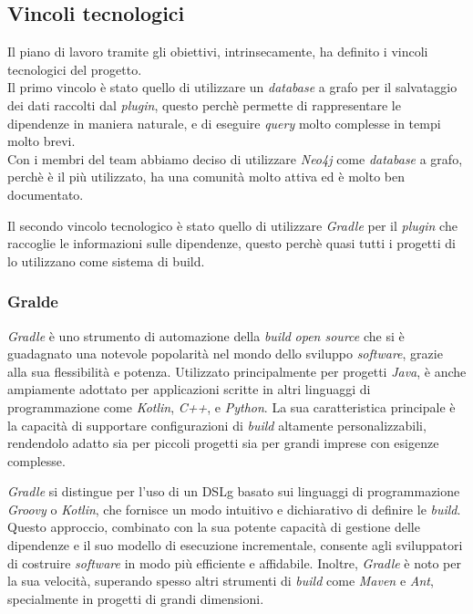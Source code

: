   \subsection*{ Vincoli tecnologici}

  Il piano di lavoro tramite gli obiettivi, intrinsecamente, ha definito i vincoli tecnologici del progetto.\\
  Il primo vincolo è stato quello di utilizzare un \textit{database} a grafo per il salvataggio dei dati raccolti dal \textit{plugin},
  questo perchè permette di rappresentare le dipendenze in maniera naturale, e di eseguire \textit{query} molto complesse in tempi molto brevi.\\
  Con i membri del team abbiamo deciso di utilizzare \textit{Neo4j} come \textit{database} a grafo, perchè è il più utilizzato, ha una comunità molto attiva
ed è molto ben documentato.

Il secondo vincolo tecnologico è stato quello di utilizzare \textit{Gradle} per il \textit{plugin} che raccoglie le informazioni sulle dipendenze,
questo perchè quasi tutti i progetti di {\azienda} lo utilizzano come sistema di build.\\

\subsubsection*{Gralde}
  \textit{Gradle} è uno strumento di automazione della \textit{build} \textit{open source} che si è guadagnato una notevole popolarità nel mondo 
dello sviluppo \textit{software}, grazie alla sua flessibilità e potenza. Utilizzato principalmente per progetti \textit{Java}, 
è anche ampiamente adottato per applicazioni scritte in altri linguaggi di programmazione come \textit{Kotlin}, \textit{C++}, e \textit{Python}. 
La sua caratteristica principale è la capacità di supportare configurazioni di \textit{build} altamente personalizzabili, 
rendendolo adatto sia per piccoli progetti sia per grandi imprese con esigenze complesse.

\textit{Gradle} si distingue per l'uso di un \gls{DSLg} basato sui linguaggi di programmazione \textit{Groovy} o \textit{Kotlin},
 che fornisce un modo intuitivo e dichiarativo di definire le \textit{build}. Questo approccio, combinato con la sua potente capacità di 
 gestione delle dipendenze e il suo modello di esecuzione incrementale, consente agli sviluppatori di costruire \textit{software} in modo più 
 efficiente e affidabile. Inoltre, \textit{Gradle} è noto per la sua velocità, superando spesso altri strumenti di \textit{build} come \textit{Maven} 
 e \textit{Ant}, specialmente in progetti di grandi dimensioni.

